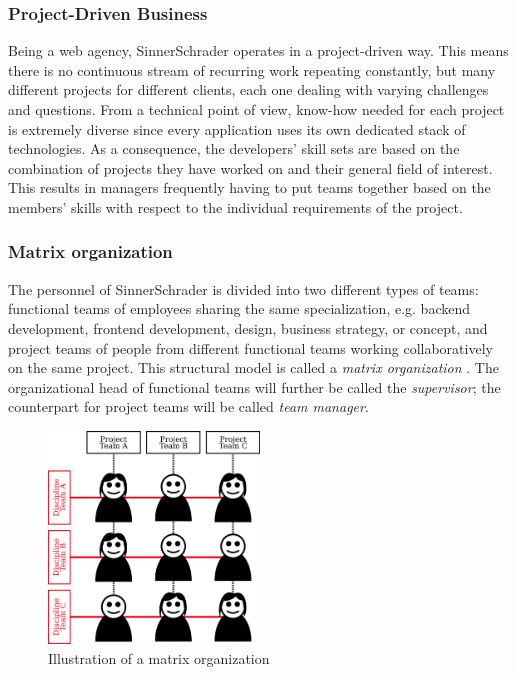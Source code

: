 \subsubsection{Project-Driven Business}
Being a web agency, SinnerSchrader operates in a project-driven way. This means there is no continuous stream of recurring work repeating constantly, but many different projects for different clients, each one dealing with varying challenges and questions. From a technical point of view, know-how needed for each project is extremely diverse since every application uses its own dedicated stack of technologies. As a consequence, the developers’ skill sets are based on the combination of projects they have worked on and their general field of interest. This results in managers frequently having to put teams together based on the members’ skills with respect to the individual requirements of the project.

\subsubsection{Matrix organization}
The personnel of SinnerSchrader is divided into two different types of teams: functional teams of
employees sharing the same specialization, e.g. backend development, frontend development, design, business strategy, or concept, and project teams of people from different functional teams working collaboratively on the same project. This structural model is called a \textit{matrix organization} \cite[P. 75]{BWL}.
The organizational head of functional teams will further be called the \textit{supervisor}; the counterpart for project teams will be called \textit{team manager}.

\begin{figure}[!htp]
    \centering
    \includegraphics[width=0.5\textwidth]{images/matrixorga.png}
    \caption[Diagram: Matrix organization]{Illustration of a matrix organization}
    \label{fig:matrixorga}
\end{figure}

